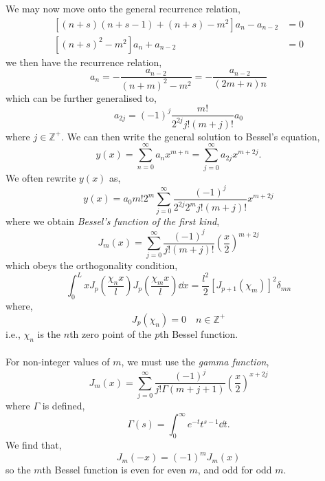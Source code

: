 \documentclass{book}
\begin{document}
\\\\
We may now move onto the general recurrence relation,
\begin{equation}
	\begin{split}
		\left[(n+s)(n+s - 1) + (n+s) - m^2\right]a_n - a_{n-2} & = 0 \\
		\left[(n+s)^2 - m^2\right]a_n + a_{n-2} & = 0
	\end{split}
\end{equation}
we then have the recurrence relation,
\begin{equation}
	a_n = -\frac{a_{n-2}}{(n+m)^2 - m^2} = -\frac{a_{n-2}}{(2m+n)n}
\end{equation}
which can be further generalised to,
\begin{equation}
	a_{2j} = (-1)^{j}\frac{m!}{2^{2j}j!(m+j)!}a_0
\end{equation}
where $j \in \mathbb{Z}^{+}$. We can then write the general solution to Bessel's equation,
\begin{equation}
	y(x) = \sum_{n=0}^{\infty}a_nx^{m+n} = \sum_{j=0}^{\infty}a_{2j}x^{m+2j}.
\end{equation}
We often rewrite $y(x)$ as,
\begin{equation}
	y(x) = a_0m!2^m \sum_{j=0}^{\infty} \frac{(-1)^j}{2^{2j}2^mj!(m+j)!}x^{m + 2j}
\end{equation}
where we obtain \textit{Bessel's function of the first kind},
\begin{equation}
	\boxed{J_m(x) = \sum_{j=0}^{\infty} \frac{(-1)^j}{j!(m+j)!}\left(\frac{x}{2}\right)^{m + 2j}}
\end{equation}
which obeys the orthogonality condition,
\begin{equation}
	\int_0^L xJ_p\left(\frac{\chi_n x}{l}\right)J_p\left(\frac{\chi_m x}{l}\right)\dd{x} = \frac{l^2}{2}\left[J_{p+1}\left(\chi_m\right)\right]^2\delta_{mn}
\end{equation}
where,
\begin{equation}
	J_p\left(\chi_n\right) = 0 \hspace{1em} n \in \mathbb{Z}^+
\end{equation}
i.e., $\chi_n$ is the $n$th zero point of the $p$th Bessel function.
\\\\
For non-integer values of $m$, we must use the \textit{gamma function},
\begin{equation}
	J_m(x) = \sum_{j=0}^{\infty}\frac{(-1)^j}{j!\Gamma(m + j + 1)}\left(\frac{x}{2}\right)^{x + 2j}
\end{equation}
where $\Gamma$ is defined,
\begin{equation}
	\Gamma(s) = \int_0^{\infty}e^{-t}t^{s-1}\dd{t}.
\end{equation}
We find that,
\begin{equation}
	J_m(-x) = (-1)^mJ_m(x)
\end{equation}
so the $m$th Bessel function is even for even $m$, and odd for odd $m$.
\end{document}
